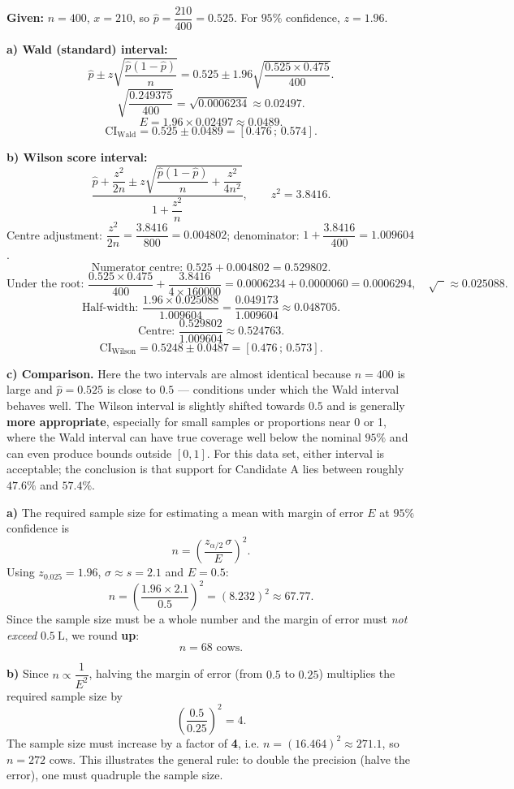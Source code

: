 \documentclass[11pt]{article}
\begin{document}
\begin{corrige}
\textbf{Given:} $n = 400$, $x = 210$, so $\hat{p} = \dfrac{210}{400} = 0.525$. For $95\%$ confidence, $z = 1.96$.

\textbf{a) Wald (standard) interval:}
\[ \hat{p} \pm z\sqrt{\frac{\hat{p}(1-\hat{p})}{n}} = 0.525 \pm 1.96\sqrt{\frac{0.525 \times 0.475}{400}}. \]
\[ \sqrt{\frac{0.249375}{400}} = \sqrt{0.0006234} \approx 0.02497. \]
\[ E = 1.96 \times 0.02497 \approx 0.0489. \]
\[ \mathrm{CI}_{\text{Wald}} = 0.525 \pm 0.0489 = [0.476\,;\,0.574]. \]

\textbf{b) Wilson score interval:}
\[ \frac{\hat{p} + \dfrac{z^2}{2n} \pm z\sqrt{\dfrac{\hat{p}(1-\hat{p})}{n} + \dfrac{z^2}{4n^2}}}{1 + \dfrac{z^2}{n}}, \qquad z^2 = 3.8416. \]
Centre adjustment: $\dfrac{z^2}{2n} = \dfrac{3.8416}{800} = 0.004802$; denominator: $1 + \dfrac{3.8416}{400} = 1.009604$.
\[ \text{Numerator centre: } 0.525 + 0.004802 = 0.529802. \]
\[ \text{Under the root: } \frac{0.525 \times 0.475}{400} + \frac{3.8416}{4 \times 160000} = 0.0006234 + 0.0000060 = 0.0006294, \quad \sqrt{\phantom{x}} \approx 0.025088. \]
\[ \text{Half-width: } \frac{1.96 \times 0.025088}{1.009604} = \frac{0.049173}{1.009604} \approx 0.048705. \]
\[ \text{Centre: } \frac{0.529802}{1.009604} \approx 0.524763. \]
\[ \mathrm{CI}_{\text{Wilson}} = 0.5248 \pm 0.0487 = [0.476\,;\,0.573]. \]

\textbf{c) Comparison.} Here the two intervals are almost identical because $n = 400$ is large and $\hat{p} = 0.525$ is close to $0.5$ — conditions under which the Wald interval behaves well. The Wilson interval is slightly shifted towards $0.5$ and is generally \textbf{more appropriate}, especially for small samples or proportions near 0 or 1, where the Wald interval can have true coverage well below the nominal $95\%$ and can even produce bounds outside $[0,1]$. For this data set, either interval is acceptable; the conclusion is that support for Candidate A lies between roughly $47.6\%$ and $57.4\%$.
\end{corrige}

\begin{corrige}
\textbf{a)} The required sample size for estimating a mean with margin of error $E$ at $95\%$ confidence is
\[ n = \left(\frac{z_{\alpha/2}\,\sigma}{E}\right)^2. \]
Using $z_{0.025} = 1.96$, $\sigma \approx s = 2.1$ and $E = 0.5$:
\[ n = \left(\frac{1.96 \times 2.1}{0.5}\right)^2 = (8.232)^2 \approx 67.77. \]
Since the sample size must be a whole number and the margin of error must \emph{not exceed} $0.5\ \mathrm{L}$, we round \textbf{up}:
\[ \boxed{n = 68 \text{ cows}}. \]

\textbf{b)} Since $n \propto \dfrac{1}{E^2}$, halving the margin of error (from $0.5$ to $0.25$) multiplies the required sample size by
\[ \left(\frac{0.5}{0.25}\right)^2 = 4. \]
The sample size must increase by a factor of \textbf{4}, i.e. $n = (16.464)^2 \approx 271.1$, so $n = 272$ cows. This illustrates the general rule: to double the precision (halve the error), one must quadruple the sample size.
\end{corrige}
\end{document}
